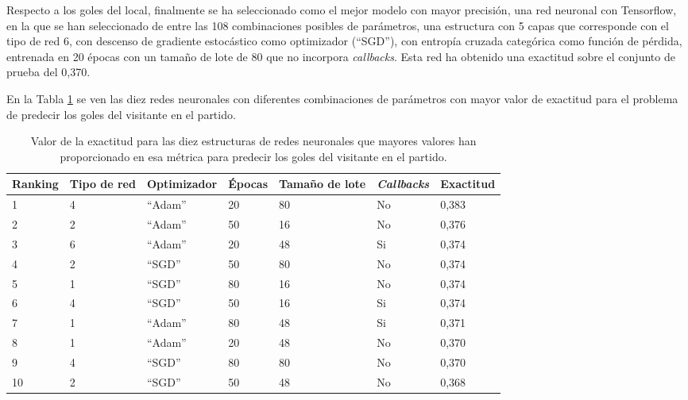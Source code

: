 Respecto a los goles del local, finalmente se ha seleccionado como el mejor modelo con mayor
precisión, una red neuronal con Tensorflow, en la que se han seleccionado de entre las 108
combinaciones posibles de parámetros, una estructura con 5 capas que corresponde con el tipo de red 6, con descenso de gradiente
estocástico como optimizador (``SGD''), con entropía cruzada categórica como función de pérdida,
entrenada en 20 épocas con un tamaño de lote de 80 que no incorpora \textit{callbacks}. Esta red ha
obtenido una exactitud sobre el conjunto de prueba del 0,370.

En la Tabla \ref{table:exactitud-redes-visitante} se ven las diez redes neuronales con diferentes combinaciones de parámetros con mayor valor de exactitud para el problema de predecir los goles del visitante en el partido.

\begin{table}[]
    \centering
    \begin{tabular}{|l|l|l|l|l|l|l|}
        \hline
        \rowcolor[HTML]{C0C0C0}
        Ranking & Tipo de red & Optimizador & Épocas & Tamaño de lote & \textit{Callbacks} & Exactitud \\ \hline
        1                & 4           & ``Adam''         & 20     & 80         & No        & 0,383     \\ \hline
        2                & 2           & ``Adam''        & 50     & 16         & No        & 0,376     \\ \hline
        3                & 6           & ``Adam''        & 20     & 48         & Si        & 0,374     \\ \hline
        4                & 2           & ``SGD''        & 50     & 80         & No        & 0,374     \\ \hline
        5                & 1           & ``SGD''         & 80     & 16         & No        & 0,374     \\ \hline
        6                & 4           & ``SGD''        & 50     & 16         & Si        & 0,374     \\ \hline
        7                & 1           & ``Adam''        & 80     & 48         & Si        & 0,371     \\ \hline
        8                & 1           & ``Adam''        & 20     & 48         & No        & 0,370     \\ \hline
        9                & 4           & ``SGD''         & 80     & 80         & No        & 0,370     \\ \hline
        10               & 2           & ``SGD''        & 50     & 48         & No        & 0,368     \\ \hline
    \end{tabular}
    \caption{Valor de la exactitud para las diez estructuras de redes neuronales que mayores valores han proporcionado en esa métrica para predecir los goles del visitante en el partido.}
    \label{table:exactitud-redes-visitante}
\end{table}


